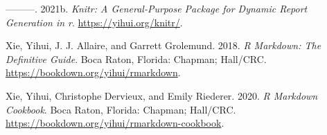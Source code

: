 \documentclass[
]{book}
\newlength{\cslhangindent}
\newlength{\cslentryspacingunit} %
\newenvironment{CSLReferences}[2] %
 {%
  \setlength{\parindent}{0pt}
  \ifodd #1
  \let\oldpar\par
  \def\par{\hangindent=\cslhangindent\oldpar}
  \fi
  \setlength{\parskip}{#2\cslentryspacingunit}
 }%
 {}
\begin{document}
\begin{CSLReferences}{1}{0}
\leavevmode{}%
---------. 2021b. \emph{Knitr: A General-Purpose Package for Dynamic Report Generation in r}. \url{https://yihui.org/knitr/}.

\leavevmode{}%
Xie, Yihui, J. J. Allaire, and Garrett Grolemund. 2018. \emph{R Markdown: The Definitive Guide}. Boca Raton, Florida: Chapman; Hall/CRC. \url{https://bookdown.org/yihui/rmarkdown}.

\leavevmode{}%
Xie, Yihui, Christophe Dervieux, and Emily Riederer. 2020. \emph{R Markdown Cookbook}. Boca Raton, Florida: Chapman; Hall/CRC. \url{https://bookdown.org/yihui/rmarkdown-cookbook}.

\end{CSLReferences}
\end{document}
